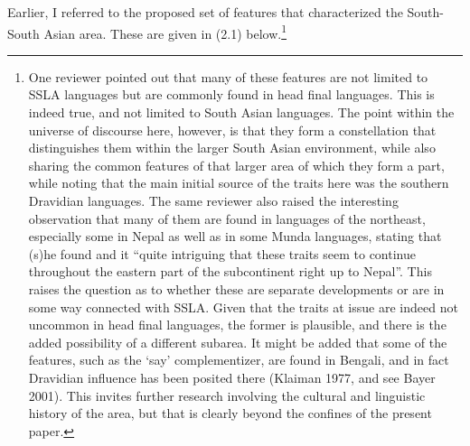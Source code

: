 \documentclass[letterpaper]{article}
\begin{document}
Earlier, I referred to the proposed set of features that characterized the South-South Asian area. These are given in (2.1) below.\footnote{One
  reviewer pointed out that many of these features are not limited to SSLA languages but are commonly found in head final languages. This is indeed true, and not limited to South Asian languages. The point within the universe of discourse here, however, is that they form a constellation that distinguishes them within the larger South Asian environment, while also sharing the common features of that larger area of which they form a part, while noting that the main initial  source of the traits here was the southern Dravidian languages. The same reviewer also raised the interesting observation that many of them are found in languages of the northeast, especially some in Nepal as well as in some Munda languages, stating that (s)he found and  it ``quite intriguing that these traits seem to continue throughout the eastern part of the subcontinent right up to Nepal''. This raises the question as to whether these are separate developments or are in some way connected with SSLA. Given that the traits at issue are indeed not uncommon in head final languages, the former is plausible, and there is the added possibility of a different subarea. It might be added that some of the features, such as the `say' complementizer, are found in Bengali, and in fact Dravidian influence has been posited there (Klaiman 1977, and see Bayer 2001).  This invites further research involving the cultural and linguistic history of the area, but that is clearly beyond the confines of the present paper.
} 
\end{document}
